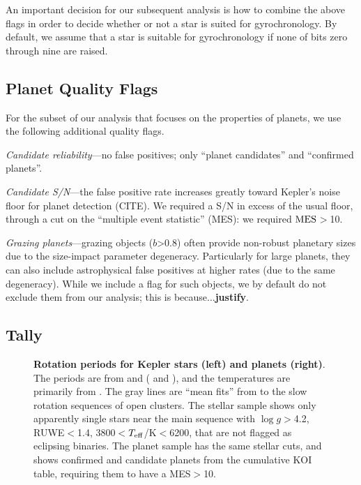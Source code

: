 \documentclass[11pt,twocolumn,tighten]{aastex63}
\begin{document}
An important decision for our subsequent analysis is how to combine
the above flags in order to decide whether or not a star is suited for
gyrochronology.  By default, we assume that a star is suitable for
gyrochronology if none of bits zero through nine are raised.


\subsection{Planet Quality Flags}
For the subset of our analysis that focuses on the properties of
planets, we use the following additional quality flags.

{\it Candidate reliability}---no false positives; only ``planet
candidates'' and ``confirmed planets''.

{\it Candidate S/N}---the false positive rate increases greatly toward
Kepler's noise floor for planet detection (CITE).  We required a S/N
in excess of the usual floor, through a cut on the ``multiple event
statistic'' (MES): we required ${\rm MES}$$>$10.

{\it Grazing planets}---grazing objects ($b$>0.8) often provide
non-robust planetary sizes due to the size-impact parameter
degeneracy.  Particularly for large planets, they can also include
astrophysical false positives at higher rates (due to the same
degeneracy).  While we include a flag for such objects, we by default
do not exclude them from our analysis; this is because...{\bf justify}.

\subsection{Tally}
\label{subsec:tally}

\begin{figure}[!t]
	\begin{center}
	\end{center}
	\vspace{-0.5cm}
	\caption{
    {\bf Rotation periods for Kepler stars (left) and planets (right)}.
    The periods are from \citet{Santos_2019} and \citet{Santos_2021}
    ( and ), and the
    temperatures are primarily from \citet{Berger_2020a_catalog}.  The
    gray lines are ``mean fits'' from \citet{Bouma_2023} to the slow
    rotation sequences of open clusters.  The stellar sample shows
    only apparently single stars near the main sequence with $\log
    g$$>$4.2, RUWE$<$1.4, 3800$<$$T_{\rm eff}$/K$<$6200, that are not
    flagged as eclipsing binaries.  The planet sample has the same
    stellar cuts, and shows confirmed and candidate planets from the
    cumulative KOI table, requiring them to have a MES$>$10.
	}
	\label{fig:prot_vs_teff}
\end{figure}
\end{document}
